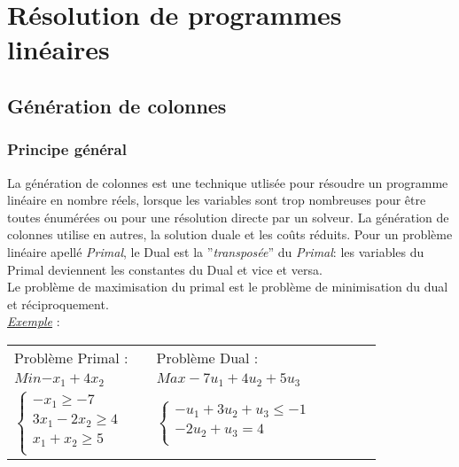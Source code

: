 \section{Résolution de programmes linéaires}

\subsection{Génération de colonnes}
\subsubsection{Principe général}
La génération de colonnes est une technique utlisée pour résoudre un programme linéaire en nombre réels, lorsque les variables sont trop nombreuses pour être toutes énumérées ou pour une résolution directe par un solveur. La génération de colonnes utilise en autres, la solution duale et les coûts réduits. \cite{introBCBP}
Pour un problème linéaire apellé \textit{Primal}, le Dual est la ''\textit{transposée}'' du \textit{Primal}: les variables du Primal deviennent les constantes du Dual et vice et versa. \\
Le problème de maximisation du primal est le problème de minimisation du dual et réciproquement.
\newline
\\
\underline{\textit{Exemple}} : 
\\


\begin{tabular}{ l p{5 cm}l p{5 cm}  l p{5 cm} l}
Problème Primal : & & 
Problème Dual : \\

$Min{ - x_1 + 4x_2}$ & &  $Max -7\textit{u}_1 + 4\textit{u}_2 + 5\textit{u}_3$\\ 


$\left\lbrace
\begin{array}{l}
-x_1\geq -7\\
3x_1-2x_2 \geq 4\\
x_1+x_2 \geq 5\\
\end{array}
\right.$ 
& & 
$\left\lbrace
\begin{array}{l}
-\textit{u}_1 + 3\textit{u}_2 + \textit{u}_3 \leq -1 \\
-2\textit{u}_2 + \textit{u}_3 = 4 \\
\end{array}
\right.$
\end{tabular}


